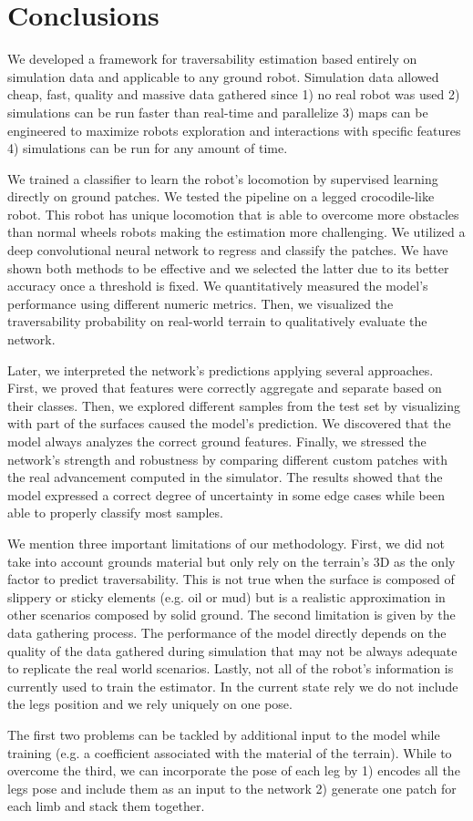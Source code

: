 \documentclass[../document.tex]{subfiles}
\begin{document}
\chapter{Conclusions}
\label{chap : conclusions}
We developed a framework for traversability estimation based entirely on simulation data and applicable to any ground robot. Simulation data allowed cheap, fast, quality and massive data gathered since 1) no real robot was used 2) simulations can be run faster than real-time and parallelize 3) maps can be engineered to maximize robots exploration and interactions with specific features 4) simulations can be run for any amount of time. 

We trained a classifier to learn the robot's locomotion by supervised learning directly on ground patches. We tested the pipeline on a legged crocodile-like robot. This robot has unique locomotion that is able to overcome more obstacles than normal wheels robots making the estimation more challenging.
We utilized a deep convolutional neural network to regress and classify the patches. We have shown both methods to be effective and we selected the latter due to its better accuracy once a threshold is fixed. We quantitatively measured the model's performance using different numeric metrics. Then, we visualized the traversability probability on real-world terrain to qualitatively evaluate the network. 

Later, we interpreted the network's predictions applying several approaches. First, we proved that features were correctly aggregate and separate based on their classes. Then, we explored different samples from the test set by visualizing with part of the surfaces caused the model's prediction. We discovered that the model always analyzes the correct ground features. Finally, we stressed the network's strength and robustness by comparing different custom patches with the real advancement computed in the simulator. The results showed that the model expressed a correct degree of uncertainty in some edge cases while been able to properly classify most samples.

We mention three important limitations of our methodology. First, we did not take into account grounds material but only rely on the terrain's 3D as the only factor to predict traversability. This is not true when the surface is composed of slippery or sticky elements (e.g. oil or mud) but is a realistic approximation in other scenarios composed by solid ground. The second limitation is given by the data gathering process.  The performance of the model directly depends on the quality of the data gathered during simulation that may not be always adequate to replicate the real world scenarios. Lastly, not all of the robot's information is currently used to train the estimator. In the current state rely we do not include the legs position and we rely uniquely on one pose.  

The first two problems can be tackled by additional input to the model while training (e.g. a coefficient associated with the material of the terrain).  While to overcome the third, we can incorporate the pose of each leg by 1) encodes all the legs pose and include them as an input to the network  2) generate one patch for each limb and stack them together.
\end{document}
